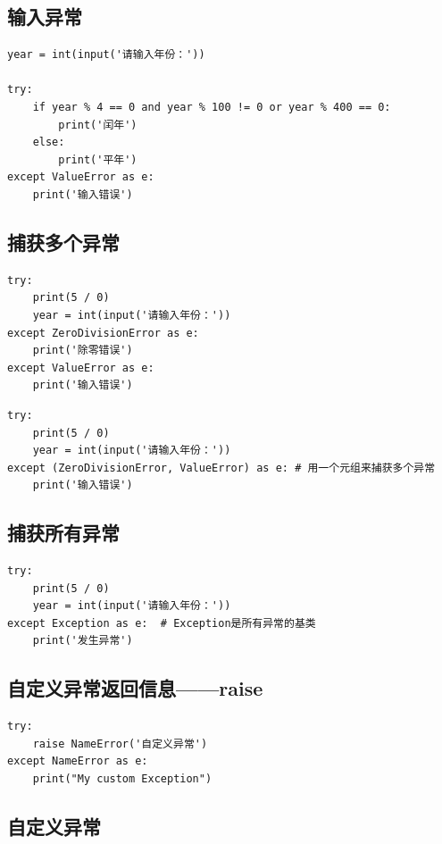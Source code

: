 \subsection{输入异常}
\begin{lstlisting}[style=pythonstyle,numbers=none]
year = int(input('请输入年份：'))

try:
    if year % 4 == 0 and year % 100 != 0 or year % 400 == 0:
        print('闰年')
    else:
        print('平年')
except ValueError as e:
    print('输入错误')
\end{lstlisting}

\subsection{捕获多个异常}
\begin{lstlisting}[style=pythonstyle,numbers=none]
try:
    print(5 / 0)
    year = int(input('请输入年份：'))
except ZeroDivisionError as e:
    print('除零错误')
except ValueError as e:
    print('输入错误')
\end{lstlisting}

\begin{lstlisting}[style=pythonstyle,numbers=none]
try:
    print(5 / 0)
    year = int(input('请输入年份：'))
except (ZeroDivisionError, ValueError) as e: # 用一个元组来捕获多个异常
    print('输入错误')
\end{lstlisting}

\subsection{捕获所有异常}
\begin{lstlisting}[style=pythonstyle,numbers=none]
try:
    print(5 / 0)
    year = int(input('请输入年份：'))
except Exception as e:  # Exception是所有异常的基类
    print('发生异常')
\end{lstlisting}

\subsection{自定义异常返回信息——raise}
\begin{lstlisting}[style=pythonstyle,numbers=none]
try:
    raise NameError('自定义异常')
except NameError as e:
    print("My custom Exception")
\end{lstlisting}

\subsection{自定义异常}
